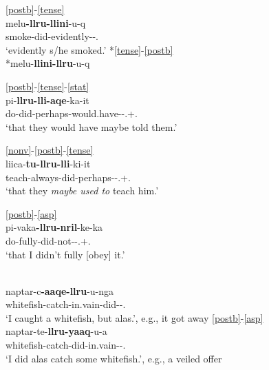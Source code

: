 \documentclass[output=paper]{langscibook}
\begin{document}
\ea\label{ex:key:13}
    \ea \label{ex:key:13a}{\ref{postb}-\ref{tense}}\\
    \gll melu\textbf{{}-llru-llini}{}-u-q\\
     smoke-did-evidently-\Ind{}-\Tsg.\Sarg{}\\
    \glt `evidently s/he smoked.'
    \ex\label{ex:key:13b}
    {*\ref{tense}-\ref{postb}}\\
    *melu-\textbf{llini-llru}{}-u-q\\
    \z
\z
    
\ea\label{ex:key:14} 
{\ref{postb}-\ref{tense}-\ref{stat}}\\
    \gll pi-\textbf{llru-lli-aqe}{}-ka-it\\
     do-did-perhaps-would.have-\Trprt-\Tpl.\Aarg{}+\Tpl.\Obj{}\\
\glt `that they would have maybe told them.'
\z

\ea\label{ex:key:15}
{\ref{nonv}-\ref{postb}-\ref{tense}}\\
\gll liica-\textbf{tu-llru-lli}{}-ki-it\\
     teach-always-did-perhaps-\Trprt-\Tpl.\Aarg{}+\Tsg.\Obj{}\\
\glt `that they \textit{maybe used to} teach him.'
\z

\ea\label{ex:key:16}
{\ref{postb}-\ref{asp}}\\
\gll pi-vaka\textbf{{}-llru-nril}{}-ke-ka\\
     do-fully-did-not-\Trprt-\Fsg.\Aarg{}+\Tsg.\Obj{}\\
\glt `that I didn't fully [obey] it.'
\z


\ea\label{ex:key:17}
    \ea {\ref{vbase}-\ref{postb}} \label{ex:key:17a}\\
    \gll naptar-c\textbf{{}-aaqe-llru}{}-u-nga\\
     whitefish-catch-in.vain-did-\Ind{}-\Fsg.\Sarg{}\\
    \glt `I caught a whitefish, but alas.', e.g., it got away
    \ex\label{ex:key:17b}
    {\ref{postb}-\ref{asp}}\\
    \gll naptar-te-\textbf{llru-yaaq}{}-u-a\\
     whitefish-catch-did-in.vain-\Ind{}-\Fsg.\Sarg{}\\
    \glt `I did alas catch some whitefish.', e.g., a veiled offer
    \z
\z
\end{document}
